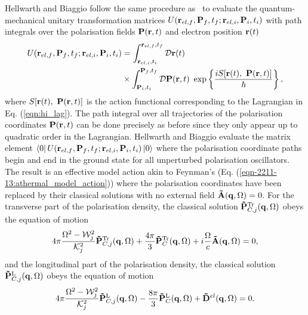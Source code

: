Hellwarth and Biaggio follow the same procedure as~\cite{feynman_slow_1955} to evaluate the quantum-mechanical unitary transformation matrices $U(\vb{r}_{el, f}, \vb{P}_f, t_f; \vb{r}_{el, i}, \vb{P}_i, t_i)$ with path integrals over the polarisation fields $\vb{P}(\vb{r}, t)$ and electron position $\vb{r}(t)$
\begin{equation}
    \begin{aligned}
    U(\vb{r}_{el, f}, \vb{P}_f, t_f; \vb{r}_{el, i}, \vb{P}_i, t_i) &= \int_{\vb{r}_{el, i}, t_i}^{\vb{r}_{el, f}, t_f} \mathcal{D}\vb{r}(t) \\
    &\times \int_{\vb{P}_i, t_i}^{\vb{P}_f, t_f} \mathcal{D}\vb{P}(\vb{r}, t)\ \exp\left\{{\frac{iS[\vb{r}(t),\ \vb{P}(\vb{r}, t)]}{\hbar}}\right\},
    \end{aligned}
\end{equation}
where $S[\vb{r}(t),\ \vb{P}(\vb{r}, t)]$ is the action functional corresponding to the Lagrangian in Eq. (\ref{eqn:hi_lag}). The path integral over all trajectories of the polarisation coordinates $\vb{P}(\vb{r}, t)$ can be done precisely as before since they only appear up to quadratic order in the Lagrangian. Hellwarth and Biaggio evaluate the matrix element $\bra{0} U(\vb{r}_{el, f}, \vb{P}_f, t_f; \vb{r}_{el, i}, \vb{P}_i, t_i) \ket{0}$ where the polarisation coordinate paths begin and end in the ground state for all unperturbed polarisation oscillators. The result is an effective model action akin to Feynman's (Eq. (\ref{eqn-2211-13:athermal_model_action})) where the polarisation coordinates have been replaced by their classical solutions with no external field $\vb{\Tilde{A}}(\vb{q}, \Omega) = 0$. For the transverse part of the polarisation density, the classical solution $\vb{\Tilde{P}}^{\text{Tr}}_{C, j}(\vb{q}, \Omega)$ obeys the equation of motion
\begin{equation}
    4\pi \frac{\Omega^2 - \mathcal{W}_j^2}{\mathcal{K}_j^2} \vb{\Tilde{P}}^{\text{Tr}}_{C, j}(\vb{q}, \Omega) + \frac{4\pi}{3} \vb{\Tilde{P}}^{\text{Tr}}_{C}(\vb{q}, \Omega) + i \frac{\Omega}{c} \vb{\Tilde{A}}(\vb{q}, \Omega) = 0,
\end{equation}
and the longitudinal part of the polarisation density, the classical solution $\vb{\Tilde{P}}^{\text{L}}_{C, j}(\vb{q}, \Omega)$ obeys the equation of motion
\begin{equation}
    4\pi \frac{\Omega^2 - \mathcal{W}_j^2}{\mathcal{K}_j^2} \vb{\Tilde{P}}^{\text{L}}_{C, j}(\vb{q}, \Omega) - \frac{8\pi}{3} \vb{\Tilde{P}}^{\text{L}}_{C}(\vb{q}, \Omega) + \vb{\Tilde{D}}^{el}(\vb{q}, \Omega) = 0.
\end{equation}
